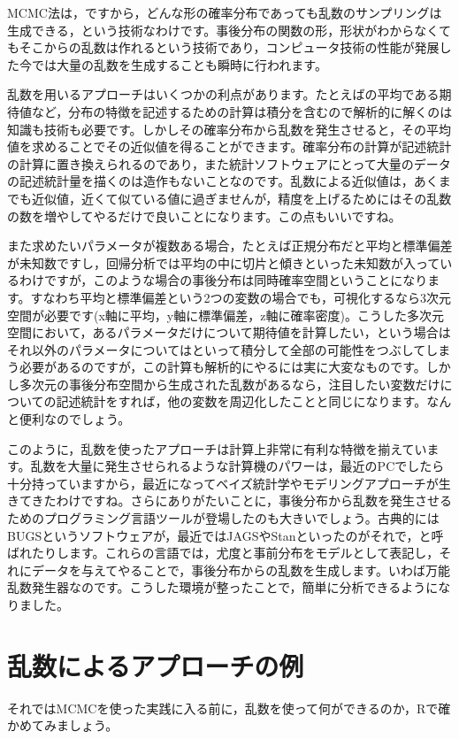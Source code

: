 \documentclass{ltjsbook}
\begin{document}
MCMC法は，ですから，どんな形の確率分布であっても乱数のサンプリングは生成できる，という技術なわけです。事後分布の関数の形，形状がわからなくてもそこからの乱数は作れるという技術であり，コンピュータ技術の性能が発展した今では大量の乱数を生成することも瞬時に行われます。

乱数を用いるアプローチはいくつかの利点があります。たとえばの平均である期待値など，分布の特徴を記述するための計算は積分を含むので解析的に解くのは知識も技術も必要です。しかしその確率分布から乱数を発生させると，その平均値を求めることでその近似値を得ることができます。確率分布の計算が記述統計の計算に置き換えられるのであり，また統計ソフトウェアにとって大量のデータの記述統計量を描くのは造作もないことなのです。乱数による近似値は，あくまでも近似値，近くて似ている値に過ぎませんが，精度を上げるためにはその乱数の数を増やしてやるだけで良いことになります。この点もいいですね。

また求めたいパラメータが複数ある場合，たとえば正規分布だと平均と標準偏差が未知数ですし，回帰分析では平均の中に切片と傾きといった未知数が入っているわけですが，このような場合の事後分布は同時確率空間ということになります。すなわち平均と標準偏差という2つの変数の場合でも，可視化するなら3次元空間が必要です(x軸に平均，y軸に標準偏差，z軸に確率密度)。こうした多次元空間において，あるパラメータだけについて期待値を計算したい，という場合はそれ以外のパラメータについてはといって積分して全部の可能性をつぶしてしまう必要があるのですが，この計算も解析的にやるには実に大変なものです。しかし多次元の事後分布空間から生成された乱数があるなら，注目したい変数だけについての記述統計をすれば，他の変数を周辺化したことと同じになります。なんと便利なのでしょう。

このように，乱数を使ったアプローチは計算上非常に有利な特徴を揃えています。乱数を大量に発生させられるような計算機のパワーは，最近のPCでしたら十分持っていますから，最近になってベイズ統計学やモデリングアプローチが生きてきたわけですね。さらにありがたいことに，事後分布から乱数を発生させるためのプログラミング言語ツールが登場したのも大きいでしょう。古典的にはBUGSというソフトウェアが，最近ではJAGSやStanといったのがそれで，と呼ばれたりします。これらの言語では，尤度と事前分布をモデルとして表記し，それにデータを与えてやることで，事後分布からの乱数を生成します。いわば万能乱数発生器なのです。こうした環境が整ったことで，簡単に分析できるようになりました。

\section{乱数によるアプローチの例}
それではMCMCを使った実践に入る前に，乱数を使って何ができるのか，Rで確かめてみましょう。
\end{document}
